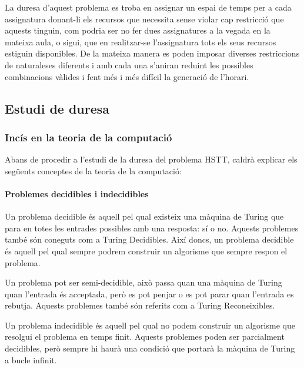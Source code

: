 \documentclass[11pt,a4paper,twoside]{report}
\begin{document}
    La duresa d'aquest problema es troba en assignar un espai de temps per a cada assignatura donant-li els recursos que necessita sense violar cap restricció que aquests tinguin, 
    com podria ser no fer dues assignatures a la vegada en la mateixa aula, o sigui, que en realitzar-se l'assignatura tots els seus recursos estiguin disponibles.  
    De la mateixa manera es poden imposar diverses restriccions de naturaleses diferents i amb cada una s'aniran reduint les possibles combinacions vàlides i fent més i més difícil la generació de l'horari.
    \subsection{Estudi de duresa}

    

    \subsubsection{Incís en la teoria de la computació}
    Abans de procedir a l'estudi de la duresa del problema HSTT, caldrà explicar els següents conceptes de la teoria de la computació: 
    \paragraph*{Problemes decidibles i indecidibles}

    Un problema decidible és aquell pel qual existeix una màquina de Turing que para en totes les entrades possibles amb una resposta: sí o no. Aquests problemes també són coneguts com a Turing Decidibles. 
    Així doncs, un problema decidible és aquell pel qual sempre podrem construir un algorisme que sempre respon el problema.
    
    Un problema pot ser semi-decidible, això passa quan una màquina de Turing quan l'entrada és acceptada, però es pot penjar o es pot parar quan l'entrada es rebutja. Aquests problemes també són referits com a Turing Reconeixibles.
    
    Un problema indecidible és aquell pel qual no podem construir un algorisme que resolgui el problema en temps finit. Aquests problemes poden ser parcialment decidibles, però sempre hi haurà una condició que portarà la màquina de Turing a bucle infinit.
\end{document}
